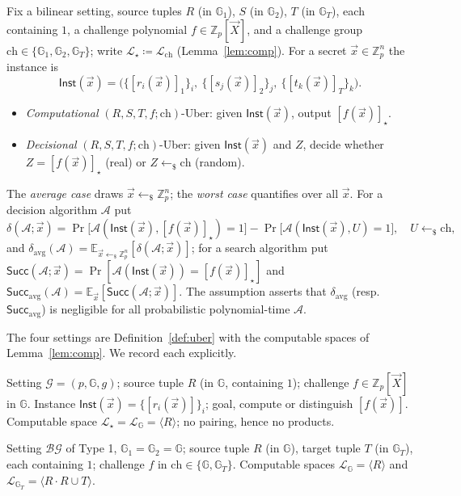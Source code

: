 \documentclass{aicr-solution}
\newcommand{\G}{\mathbb{G}}
\newcommand{\Gone}{\mathbb{G}_1}
\newcommand{\Gtwo}{\mathbb{G}_2}
\newcommand{\GT}{\mathbb{G}_T}
\newcommand{\Zp}{\mathbb{Z}_p}
\newcommand{\vx}{\vec{x}}
\newcommand{\vX}{\vec{X}}
\newcommand{\Inst}{\mathsf{Inst}}
\newcommand{\Succ}{\mathsf{Succ}}
\newcommand{\Ex}{\mathbb{E}}
\newcommand{\LL}{\mathcal{L}}
\newcommand{\Span}[1]{\langle #1 \rangle} %
\newcommand{\rsample}{\leftarrow_{\$}}
\newcommand{\bg}{\mathcal{BG}}
\newcommand{\ch}{\mathrm{ch}}
\begin{document}
\begin{definition}
\label{def:uber}
Fix a bilinear setting, source tuples $R$ (in $\Gone$), $S$ (in $\Gtwo$), $T$ (in $\GT$),
each containing $1$, a challenge polynomial $f\in\Zp[\vX]$, and a challenge group
$\ch\in\{\Gone,\Gtwo,\GT\}$; write $\LL_\star\coloneqq\LL_{\ch}$ (Lemma~\ref{lem:comp}).
For a secret $\vx\in\Zp^{n}$ the instance is
\[
  \Inst(\vx)=\bigl(\{[r_i(\vx)]_1\}_i,\ \{[s_j(\vx)]_2\}_j,\ \{[t_k(\vx)]_T\}_k\bigr).
\]
\begin{itemize}[leftmargin=1.4em,itemsep=2pt]
  \item \emph{Computational} $(R,S,T,f;\ch)$-Uber: given $\Inst(\vx)$, output
        $[f(\vx)]_\star$.
  \item \emph{Decisional} $(R,S,T,f;\ch)$-Uber: given $\Inst(\vx)$ and $Z$, decide whether
        $Z=[f(\vx)]_\star$ (real) or $Z\rsample\ch$ (random).
\end{itemize}
The \emph{average case} draws $\vx\rsample\Zp^{n}$; the \emph{worst case} quantifies over
all $\vx$. For a decision algorithm $\mathcal A$ put
\[
  \delta(\mathcal A;\vx)=\Pr\bigl[\mathcal A(\Inst(\vx),[f(\vx)]_\star)=1\bigr]
  -\Pr\bigl[\mathcal A(\Inst(\vx),U)=1\bigr],\quad U\rsample\ch,
\]
and $\delta_{\mathrm{avg}}(\mathcal A)=\Ex_{\vx\rsample\Zp^{n}}[\delta(\mathcal A;\vx)]$;
for a search algorithm put $\Succ(\mathcal A;\vx)=\Pr[\mathcal A(\Inst(\vx))=[f(\vx)]_\star]$
and $\Succ_{\mathrm{avg}}(\mathcal A)=\Ex_{\vx}[\Succ(\mathcal A;\vx)]$. The assumption
asserts that $\delta_{\mathrm{avg}}$ (resp.\ $\Succ_{\mathrm{avg}}$) is negligible for all
probabilistic polynomial-time $\mathcal A$.
\end{definition}

The four settings are Definition~\ref{def:uber} with the computable spaces of
Lemma~\ref{lem:comp}. We record each explicitly.

\begin{definition}
Setting $\mathcal G=(p,\G,g)$; source tuple $R$ (in $\G$, containing $1$); challenge
$f\in\Zp[\vX]$ in $\G$. Instance $\Inst(\vx)=\{[r_i(\vx)]\}_i$; goal, compute or distinguish
$[f(\vx)]$. Computable space $\LL_\star=\LL_{\G}=\Span{R}$; no pairing, hence no products.
\end{definition}

\begin{definition}
Setting $\bg$ of Type 1, $\Gone=\Gtwo=\G$; source tuple $R$ (in $\G$), target tuple $T$
(in $\GT$), each containing $1$; challenge $f$ in $\ch\in\{\G,\GT\}$. Computable spaces
$\LL_{\G}=\Span{R}$ and $\LL_{\GT}=\Span{R\cdot R\cup T}$.
\end{definition}
\end{document}
